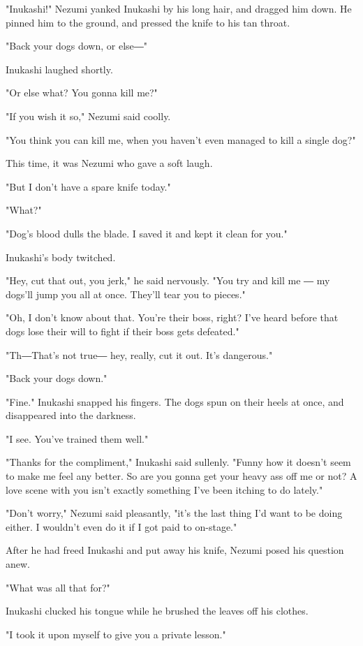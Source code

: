 "Inukashi!" Nezumi yanked Inukashi by his long hair, and dragged him
down. He pinned him to the ground, and pressed the knife to his tan
throat.

"Back your dogs down, or else―"

Inukashi laughed shortly.

"Or else what? You gonna kill me?"

"If you wish it so," Nezumi said coolly.

"You think you can kill me, when you haven't even managed to kill a
single dog?"

This time, it was Nezumi who gave a soft laugh.

"But I don't have a spare knife today."

"What?"

"Dog's blood dulls the blade. I saved it and kept it clean for you."

Inukashi's body twitched.

"Hey, cut that out, you jerk," he said nervously. "You try and kill me ―
my dogs'll jump you all at once. They'll tear you to pieces."

"Oh, I don't know about that. You're their boss, right? I've heard
before that dogs lose their will to fight if their boss gets defeated."

"Th―That's not true― hey, really, cut it out. It's dangerous."

"Back your dogs down."

"Fine." Inukashi snapped his fingers. The dogs spun on their heels at
once, and disappeared into the darkness.

"I see. You've trained them well."

"Thanks for the compliment," Inukashi said sullenly. "Funny how it
doesn't seem to make me feel any better. So are you gonna get your heavy
ass off me or not? A love scene with you isn't exactly something I've
been itching to do lately."

"Don't worry," Nezumi said pleasantly, "it's the last thing I'd want to
be doing either. I wouldn't even do it if I got paid to on-stage."

After he had freed Inukashi and put away his knife, Nezumi posed his
question anew.

"What was all that for?"

Inukashi clucked his tongue while he brushed the leaves off his clothes.

"I took it upon myself to give you a private lesson."

